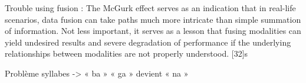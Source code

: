 Trouble using fusion : The McGurk effect serves as an indication that in real-life scenarios, data fusion can take paths much more intricate than simple summation of information. Not less important, it serves as a lesson that fusing modalities can yield undesired results and severe degradation of performance if the underlying relationships between modalities are not properly understood. [32]s

Problème syllabes -> « ba » « ga » devient « na »
